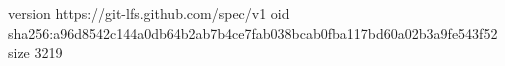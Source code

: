 version https://git-lfs.github.com/spec/v1
oid sha256:a96d8542c144a0db64b2ab7b4ce7fab038bcab0fba117bd60a02b3a9fe543f52
size 3219
